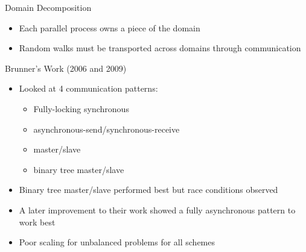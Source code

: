 \documentclass{beamer}
\begin{document}
\begin{frame}{Domain Decomposition}

  \begin{itemize}
  \item Each parallel process owns a piece of the domain
  \item Random walks must be transported across domains through
    communication
  \end{itemize}

  \begin{beamerboxesrounded}[upper=boxheadcolor,lower=boxbodycolor,shadow=true]
    {Brunner's Work (2006 and 2009)}

    \begin{itemize}
    \item Looked at 4 communication patterns:
      \begin{itemize}
      \item Fully-locking synchronous
      \item asynchronous-send/synchronous-receive
      \item master/slave
      \item binary tree master/slave
      \end{itemize}
    \item Binary tree master/slave performed best but race conditions observed
    \item A later improvement to their work showed a fully asynchronous
      pattern to work best
    \item Poor scaling for unbalanced problems for all schemes
    \end{itemize}
    
  \end{beamerboxesrounded}

\end{frame}
\end{document}
